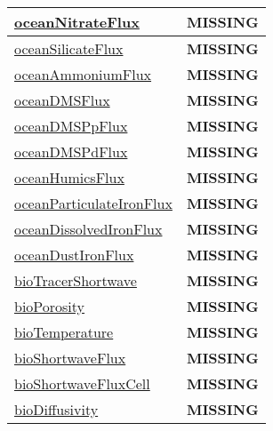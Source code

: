 {\begin{center}
\begin{longtable}{| p{2.0in} | p{4.0in} |}
    \hline
    \hyperref[subsec:var_sec_biogeochemistry_oceanNitrateFlux]{oceanNitrateFlux} & {\bf \color{red} MISSING} \\
    \hline
    \hyperref[subsec:var_sec_biogeochemistry_oceanSilicateFlux]{oceanSilicateFlux} & {\bf \color{red} MISSING} \\
    \hline
    \hyperref[subsec:var_sec_biogeochemistry_oceanAmmoniumFlux]{oceanAmmoniumFlux} & {\bf \color{red} MISSING} \\
    \hline
    \hyperref[subsec:var_sec_biogeochemistry_oceanDMSFlux]{oceanDMSFlux} & {\bf \color{red} MISSING} \\
    \hline
    \hyperref[subsec:var_sec_biogeochemistry_oceanDMSPpFlux]{oceanDMSPpFlux} & {\bf \color{red} MISSING} \\
    \hline
    \hyperref[subsec:var_sec_biogeochemistry_oceanDMSPdFlux]{oceanDMSPdFlux} & {\bf \color{red} MISSING} \\
    \hline
    \hyperref[subsec:var_sec_biogeochemistry_oceanHumicsFlux]{oceanHumicsFlux} & {\bf \color{red} MISSING} \\
    \hline
    \hyperref[subsec:var_sec_biogeochemistry_oceanParticulateIronFlux]{oceanParticulateIronFlux} & {\bf \color{red} MISSING} \\
    \hline
    \hyperref[subsec:var_sec_biogeochemistry_oceanDissolvedIronFlux]{oceanDissolvedIronFlux} & {\bf \color{red} MISSING} \\
    \hline
    \hyperref[subsec:var_sec_biogeochemistry_oceanDustIronFlux]{oceanDustIronFlux} & {\bf \color{red} MISSING} \\
    \hline
    \hyperref[subsec:var_sec_biogeochemistry_bioTracerShortwave]{bioTracerShortwave} & {\bf \color{red} MISSING} \\
    \hline
    \hyperref[subsec:var_sec_biogeochemistry_bioPorosity]{bioPorosity} & {\bf \color{red} MISSING} \\
    \hline
    \hyperref[subsec:var_sec_biogeochemistry_bioTemperature]{bioTemperature} & {\bf \color{red} MISSING} \\
    \hline
    \hyperref[subsec:var_sec_biogeochemistry_bioShortwaveFlux]{bioShortwaveFlux} & {\bf \color{red} MISSING} \\
    \hline
    \hyperref[subsec:var_sec_biogeochemistry_bioShortwaveFluxCell]{bioShortwaveFluxCell} & {\bf \color{red} MISSING} \\
    \hline
    \hyperref[subsec:var_sec_biogeochemistry_bioDiffusivity]{bioDiffusivity} & {\bf \color{red} MISSING} \\

\end{longtable}
\end{center}}
